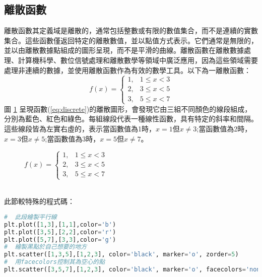 \documentclass[12pt, a4paper]{article}
\begin{document}
\subsection{離散函數}
離散函數其定義域是離散的，通常包括整數或有限的數值集合，而不是連續的實數集合。這些函數僅返回特定的離散數值，並以點值方式表示。它們通常是無限的，並以由離散數據點組成的圖形呈現，而不是平滑的曲線。離散函數在離散數據處理、計算機科學、數位信號處理和離散數學等領域中廣泛應用，因為這些領域需要處理非連續的數據，並使用離散函數作為有效的數學工具。以下為一離散函數：
\begin{equation}\label{eq:discrete}
f(x) = \begin{cases}1, & 1 \leq x < 3 \\2, &3 \leq x < 5 \\3, &5 \leq x < 7 \end{cases}
\end{equation}
圖 \ref{fig:discrete} 呈現函數(\ref{eq:discrete})的離散圖形，會發現它由三組不同顏色的線段組成，分別為藍色、紅色和綠色。每組線段代表一種線性函數，具有特定的斜率和間隔。這些線段皆為左實右虛的，表示當函數值為1時，$x=1$但$x\neq 3$;當函數值為2時，$x=3$但$x\neq 5$;當函數值為3時，$x=5$但$x\neq 7$。\\
\begin{figure}[h]
    \caption{$f(x) = \begin{cases}1, & 1 \leq x < 3 \\2, &3 \leq x < 5 \\3, &5 \leq x < 7 \end{cases}$}
    \label{fig:discrete}
\end{figure}\\
此節較特殊的程式碼：
\begin{lstlisting}[language=Python]
#  此段繪製平行線
plt.plot([1,3],[1,1],color='b')
plt.plot([3,5],[2,2],color='r')
plt.plot([5,7],[3,3],color='g')
#  繪製黑點於自己想要的地方
plt.scatter([1,3,5],[1,2,3], color='black', marker='o', zorder=5)
#  用facecolors控制其為空心的點
plt.scatter([3,5,7],[1,2,3], color='black', marker='o', facecolors='none' ,s=50)
\end{lstlisting}
\end{document}
